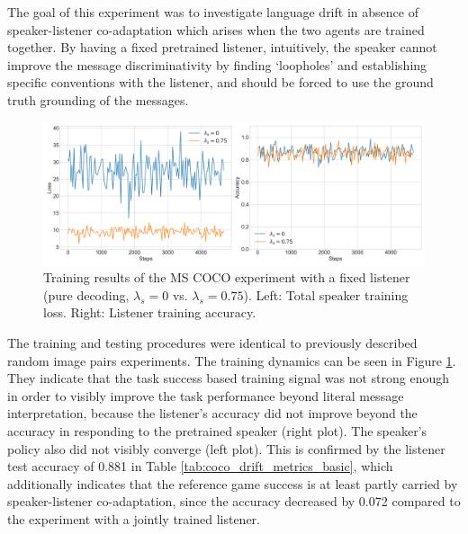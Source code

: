 The goal of this experiment was to investigate language drift in absence of speaker-listener co-adaptation which arises when the two agents are trained together. By having a fixed pretrained listener, intuitively, the speaker cannot improve the message discriminativity by finding `loopholes' and establishing specific conventions with the listener, and should be forced to use the ground truth grounding of the messages.

\begin{figure}
	\centering
	\includegraphics[width=\linewidth]{images/coco_fixedListener_baseline_random_0_075_losses.png}
	\caption{Training results of the MS COCO experiment with a fixed listener (pure decoding, $\lambda_s=0$ vs. $\lambda_s=0.75$). Left: Total speaker training loss. Right: Listener training accuracy.}
	\label{fig:coco_fixed_listener_speaker_loss_listener_acc_075}
\end{figure}

The training and testing procedures were identical to previously described random image pairs experiments. The training dynamics can be seen in Figure \ref{fig:coco_fixed_listener_speaker_loss_listener_acc_075}. They indicate that the task success based training signal was not strong enough in order to visibly improve the task performance beyond literal message interpretation, because the listener's accuracy did not improve beyond the accuracy in responding to the pretrained speaker (right plot). The speaker's policy also did not visibly converge (left plot). 
This is confirmed by the listener test accuracy of 0.881 in Table \ref{tab:coco_drift_metrics_basic}, which additionally indicates that the reference game success is at least partly carried by speaker-listener co-adaptation, since the accuracy decreased by 0.072 compared to the experiment with a jointly trained listener. 

